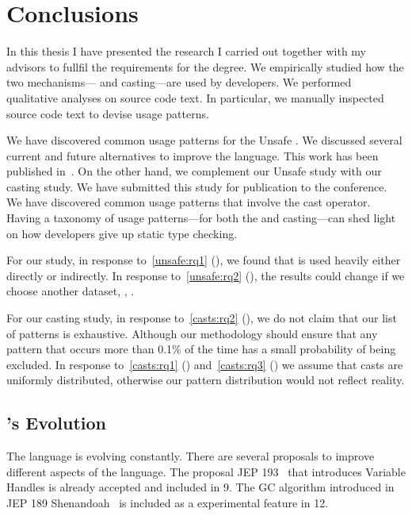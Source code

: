 \chapter{Conclusions}
\label{cha:conclusions}

In this thesis I have presented the research I carried out together with my advisors to fullfil the requirements for the \phd{} degree.
We empirically studied how the two mechanisms---\unsafe{} \api{} and casting---are used by developers.
We performed qualitative analyses on source code text.
In particular, we manually inspected source code text to devise usage patterns.

We have discovered common usage patterns for the \java{} Unsafe \api{}.
We discussed several current and future alternatives to improve the
\java{} language.
This work has been published in~\citep{mastrangeloUseYourOwn2015}.
On the other hand, we complement our Unsafe \api{} study with 
our casting study.
We have submitted this study for publication to the  conference.
We have discovered common usage patterns that involve the cast operator.
Having a taxonomy of usage patterns---for both the \unsafe{} \api{} and casting---can shed light on how \java{} developers give up static type checking.

For our \unsafe{} study,
in response to~\ref{unsafe:rq1} (\urqA{}),
we found that \smu{} is used heavily either directly or indirectly.
In response to~\ref{unsafe:rq2} (\urqB{}),
the results could change if we choose another dataset, \eg{},
\github{}.

For our casting study, in response to~\ref{casts:rq2} (\crqB{}),
we do not claim that our list of patterns is exhaustive.
Although our methodology should ensure that any pattern that occurs more
than 0.1\% of the time has a small probability of being excluded.
In response to~\ref{casts:rq1} (\crqA{}) and~\ref{casts:rq3} (\crqB{})
we assume that casts are uniformly distributed,
otherwise our pattern distribution would not reflect reality.

\section{\java{}'s Evolution}

The \java{} language is evolving constantly.
There are several proposals to improve different aspects of the language.
The proposal JEP 193~\citep{jep193} that introduces Variable Handles is already accepted and included in \java{} 9.
The GC algorithm introduced in JEP 189 Shenandoah~\citep{jep189} is included as a experimental feature in \java{} 12.

